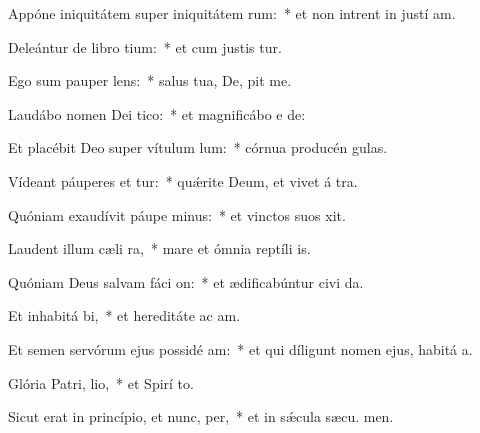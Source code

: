 \item Appóne iniquitátem super iniquitátem rum:~* et non intrent in justí am.
\item Deleántur de libro tium:~* et cum justis  tur.
\item Ego sum pauper  lens:~* salus tua, De, pit me.
\item Laudábo nomen Dei  tico:~* et magnificábo e  de:
\item Et placébit Deo super vítulum lum:~* córnua producén  gulas.
\item Vídeant páuperes et tur:~* quǽrite Deum, et vivet á tra.
\item Quóniam exaudívit páupe minus:~* et vinctos suos  xit.
\item Laudent illum cæli  ra,~* mare et ómnia reptíli  is.
\item Quóniam Deus salvam fáci on:~* et ædificabúntur civi da.
\item Et inhabitá bi,~* et hereditáte ac am.
\item Et semen servórum ejus possidé am:~* et qui díligunt nomen ejus, habitá  a.
\item Glória Patri,  lio,~* et Spirí to.
\item Sicut erat in princípio, et nunc,  per,~* et in sǽcula sæcu. men.
